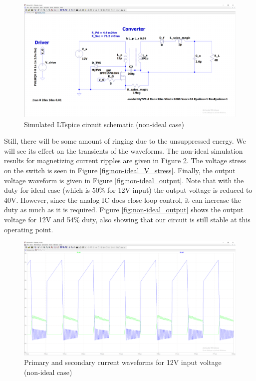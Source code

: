 \documentclass[12pt]{article}
\begin{document}
    \begin{figure}[H]
        \centering
        \includegraphics[scale=0.3]{img/Spice_Sim/Non-ideal/non-ideal_simulation_circuit.PNG}
        \caption{Simulated LTspice circuit schematic (non-ideal case)}
        \label{fig:non-ideal_sim_circuit}
    \end{figure}

    Still, there will be some amount of ringing due to the unsuppressed energy. We will see its effect on the transients of the waveforms. The non-ideal simulation results for magnetizing current ripples are given in Figure \ref{fig:non-ideal_Lm_ripple}. The voltage stress on the switch is seen in Figure \ref{fig:non-ideal_V_stress}. Finally, the output voltage waveform is given in Figure \ref{fig:non-ideal_output}. Note that with the duty for ideal case (which is 50\% for 12V input) the output voltage is reduced to 40V. However, since the analog IC does close-loop control, it can increase the duty as much as it is required. Figure \ref{fig:non-ideal_output} shows the output voltage for 12V and 54\% duty, also showing that our circuit is still stable at this operating point.\\

    \begin{figure}[H]
        \centering
        \includegraphics[scale=0.3]{img/Spice_Sim/Non-ideal/non-ideal_Lm_ripples_12V.PNG}
        \caption{Primary and secondary current waveforms for 12V input voltage (non-ideal case)}
        \label{fig:non-ideal_Lm_ripple}
    \end{figure}
\end{document}
